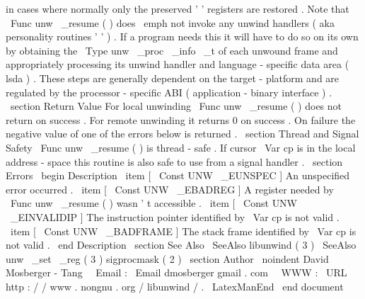 in
cases
where
normally
only
the
preserved
'
'
registers
are
restored
.
Note
that
\
Func
{
unw
\
_resume
}
(
)
does
\
emph
{
not
}
invoke
any
unwind
handlers
(
aka
personality
routines
'
'
)
.
If
a
program
needs
this
it
will
have
to
do
so
on
its
own
by
obtaining
the
\
Type
{
unw
\
_proc
\
_info
\
_t
}
of
each
unwound
frame
and
appropriately
processing
its
unwind
handler
and
language
-
specific
data
area
(
lsda
)
.
These
steps
are
generally
dependent
on
the
target
-
platform
and
are
regulated
by
the
processor
-
specific
ABI
(
application
-
binary
interface
)
.
\
section
{
Return
Value
}
For
local
unwinding
\
Func
{
unw
\
_resume
}
(
)
does
not
return
on
success
.
For
remote
unwinding
it
returns
0
on
success
.
On
failure
the
negative
value
of
one
of
the
errors
below
is
returned
.
\
section
{
Thread
and
Signal
Safety
}
\
Func
{
unw
\
_resume
}
(
)
is
thread
-
safe
.
If
cursor
\
Var
{
cp
}
is
in
the
local
address
-
space
this
routine
is
also
safe
to
use
from
a
signal
handler
.
\
section
{
Errors
}
\
begin
{
Description
}
\
item
[
\
Const
{
UNW
\
_EUNSPEC
}
]
An
unspecified
error
occurred
.
\
item
[
\
Const
{
UNW
\
_EBADREG
}
]
A
register
needed
by
\
Func
{
unw
\
_resume
}
(
)
wasn
'
t
accessible
.
\
item
[
\
Const
{
UNW
\
_EINVALIDIP
}
]
The
instruction
pointer
identified
by
\
Var
{
cp
}
is
not
valid
.
\
item
[
\
Const
{
UNW
\
_BADFRAME
}
]
The
stack
frame
identified
by
\
Var
{
cp
}
is
not
valid
.
\
end
{
Description
}
\
section
{
See
Also
}
\
SeeAlso
{
libunwind
(
3
)
}
\
SeeAlso
{
unw
\
_set
\
_reg
(
3
)
}
sigprocmask
(
2
)
\
section
{
Author
}
\
noindent
David
Mosberger
-
Tang
\
\
Email
:
\
Email
{
dmosberger
gmail
.
com
}
\
\
WWW
:
\
URL
{
http
:
/
/
www
.
nongnu
.
org
/
libunwind
/
}
.
\
LatexManEnd
\
end
{
document
}
